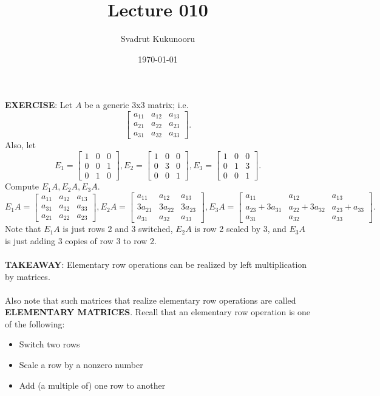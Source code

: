 \documentclass[letterpaper]{report}
\title{Lecture 010}
\author{Svadrut Kukunooru}
\date{\today}
\begin{document}
\begin{titlepage}
    \maketitle
\end{titlepage}
    \textbf{EXERCISE}: Let $A$ be a generic 3x3 matrix; i.e. 
    \[
    \begin{bmatrix} 
        a_{11} & a_{12} & a_{13} \\
        a_{21} & a_{22} & a_{23} \\
        a_{31} & a_{32} & a_{33} 
    \end{bmatrix} 
    .\] 
Also, let
\[
E_1 = 
\begin{bmatrix} 
    1 & 0 & 0 \\
    0 & 0 & 1 \\
    0 & 1 & 0
\end{bmatrix}, E_2 = 
\begin{bmatrix} 
    1 & 0 & 0 \\
    0 & 3 & 0 \\
    0 & 0 & 1 
\end{bmatrix}, E_3 = 
\begin{bmatrix} 
    1 & 0 & 0 \\
    0 & 1 & 3 \\
    0 & 0 & 1
\end{bmatrix} 
.\] 
Compute $E_1A, E_2A, E_3A$. 
\[
E_1A = 
\begin{bmatrix} 
    a_{11} & a_{12} & a_{13} \\
    a_{31} & a_{32} & a_{33} \\
    a_{21} & a_{22} & a_{23}
\end{bmatrix}, E_2A = 
\begin{bmatrix} 
    a_{11} & a_{12} & a_{13} \\
    3a_{21} & 3a_{22} & 3a_{23} \\
    a_{31} & a_{32} & a_{33}
\end{bmatrix}, E_3A = 
\begin{bmatrix} 
    a_{11} & a_{12} & a_{13} \\
    a_{23} + 3a_{31} & a_{22} + 3a_{32} & a_{23}+ a_{33} \\
    a_{31} & a_{32} & a_{33} 
\end{bmatrix} 
.\] 
Note that $E_1A$ is just rows 2 and 3 switched, $E_2A$ is row 2 scaled by 3, and $E_3A$ is just adding 3 copies of row 3 to row 2. \\ \\
\textbf{TAKEAWAY}: Elementary row operations can be realized by left multiplication by matrices. \\ \\
Also note that such matrices that realize elementary row operations are called \textbf{ELEMENTARY MATRICES}. Recall that an elementary row operation is one of the following: 
\begin{itemize}
    \item Switch two rows
    \item Scale a row by a nonzero number
    \item Add (a multiple of) one row to another
\end{itemize}
\end{document}
